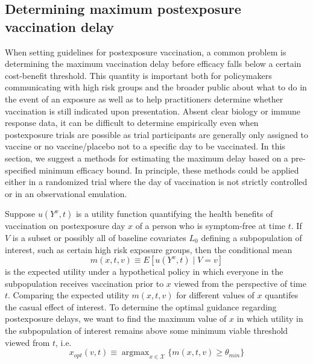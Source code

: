\begin{appendix}
    \subsection{Determining maximum postexposure vaccination delay} \label{sec:maxdelay}
    When setting guidelines for postexposure vaccination, a common problem is determining the maximum vaccination delay before efficacy falls below a certain cost-benefit threshold. This quantity is important both for policymakers communicating with high risk groups and the broader public about what to do in the event of an exposure as well as to help practitioners determine whether vaccination is still indicated upon presentation. Absent clear biology or immune response data, it can be difficult to determine empirically even when postexposure trials are possible as trial participants are generally only assigned to vaccine or no vaccine/placebo not to a specific day to be vaccinated. In this section, we suggest a methods for estimating the maximum delay based on a pre-specified minimum efficacy bound. In principle, these methods could be applied either in a randomized trial where the day of vaccination is not strictly controlled or in an observational emulation. 
 
    Suppose $u(Y^x, t)$ is a utility function quantifying the health benefits of vaccination on postexposure day $x$ of a person who is symptom-free at time $t$. If $V$ is a subset or possibly all of baseline covariates $L_0$ defining a subpopulation of interest, such as certain high risk exposure groups, then the conditional mean
    $$m(x, t, v) \equiv E[u(Y^x, t) \mid V = v]$$
    is the expected utility under a hypothetical policy in which everyone in the subpopulation receives vaccination prior to $x$ viewed from the perspective of time $t$. Comparing the expected utility $m(x, t, v)$ for different values of $x$ quantifes the casual effect of interest. To determine the optimal guidance regarding postexposure delays, we want to find the maximum value of $x$ in which 
    utility in the subpopulation of interest remains above some minimum viable threshold viewed from $t$, i.e.
    $$x_{opt}(v, t) \equiv \operatorname{argmax}_{x \in \mathcal{X}} \{m(x, t, v) \geq \theta_{min} \}$$
    

\end{appendix}
